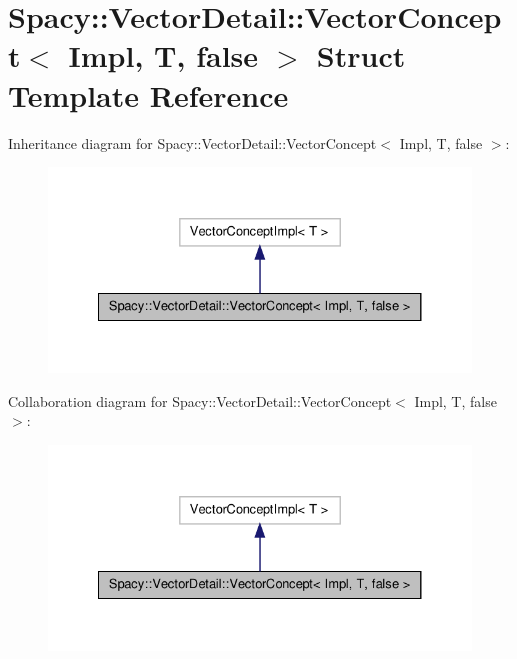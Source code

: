 \hypertarget{structSpacy_1_1VectorDetail_1_1VectorConcept_3_01Impl_00_01T_00_01false_01_4}{\section{\-Spacy\-:\-:\-Vector\-Detail\-:\-:\-Vector\-Concept$<$ \-Impl, \-T, false $>$ \-Struct \-Template \-Reference}
\label{structSpacy_1_1VectorDetail_1_1VectorConcept_3_01Impl_00_01T_00_01false_01_4}
}


\-Inheritance diagram for \-Spacy\-:\-:\-Vector\-Detail\-:\-:\-Vector\-Concept$<$ \-Impl, \-T, false $>$\-:
\nopagebreak
\begin{figure}[H]
\begin{center}
\leavevmode
\includegraphics[width=330pt]{structSpacy_1_1VectorDetail_1_1VectorConcept_3_01Impl_00_01T_00_01false_01_4__inherit__graph}
\end{center}
\end{figure}


\-Collaboration diagram for \-Spacy\-:\-:\-Vector\-Detail\-:\-:\-Vector\-Concept$<$ \-Impl, \-T, false $>$\-:
\nopagebreak
\begin{figure}[H]
\begin{center}
\leavevmode
\includegraphics[width=330pt]{structSpacy_1_1VectorDetail_1_1VectorConcept_3_01Impl_00_01T_00_01false_01_4__coll__graph}
\end{center}
\end{figure}
